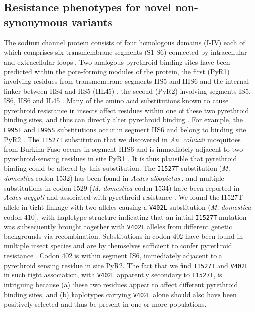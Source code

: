 \documentclass[a4paper,11pt,abstracton,hidelinks]{scrartcl}
\begin{document}
\subsection*{Resistance phenotypes for novel non-synonymous variants}

%
The sodium channel protein consists of four homologous domains (I-IV) each of which comprises six transmembrane segments (S1-S6) connected by intracellular and extracellular loops \cite{Dong2014}.
%
Two analogous pyrethroid binding sites have been predicted within the pore-forming modules of the protein, the first (PyR1) involving residues from transmembrane segments IIS5 and IIIS6 and the internal linker between IIS4 and IIS5 (IIL45) \cite{OReilly2006}, the second (PyR2) involving segments IS5, IS6, IIS6 and IL45 \cite{Du2013,Dong2014}.
%
Many of the amino acid substitutions known to cause pyrethroid resistance in insects affect residues within one of these two pyrethroid binding sites, and thus can directly alter pyrethroid binding \cite{Dong2014}.
%
For example, the \texttt{L995F} and \texttt{L995S} substitutions occur in segment IIS6 and belong to binding site PyR2 \cite{Du2013}.
%
The \texttt{I1527T} substitution that we discovered in \textit{An. coluzzii} mosquitoes from Burkina Faso occurs in segment IIIS6 and is immediately adjacent to two pyrethroid-sensing residues in site PyR1 \cite{Dong2014}.
%
It is thus plausible that pyrethroid binding could be altered by this substitution.
%
The \texttt{I1527T} substitution (\textit{M. domestica} codon 1532) has been found in \textit{Aedes albopictus} \cite{Xu2016}, and multiple substitutions in codon 1529 (\textit{M. domestica} codon 1534) have been reported in \textit{Aedes aegypti} and associated with pyrethroid resistance \cite{Dong2014,Li2018}.
%
We found the I1527T allele in tight linkage with two alleles causing a \texttt{V402L} substitution (\textit{M. domestica} codon 410), with haplotype structure indicating that an initial \texttt{I1527T} mutation was subsequently brought together with \texttt{V402L} alleles from different genetic backgrounds via recombination.
%
Substitutions in codon 402 have been found in multiple insect species and are by themselves sufficient to confer pyrethroid resistance \cite{Dong2014}.
%
Codon 402 is within segment IS6, immediately adjacent to a pyrethroid sensing residue in site PyR2.
%
The fact that we find \texttt{I1527T} and \texttt{V402L} in such tight association, with \texttt{V402L} apparently secondary to \texttt{I1527T}, is intriguing because (a) these two residues appear to affect different pyrethroid binding sites, and (b) haplotypes carrying \texttt{V402L} alone should also have been positively selected and thus be present in one or more populations.
%
\end{document}
